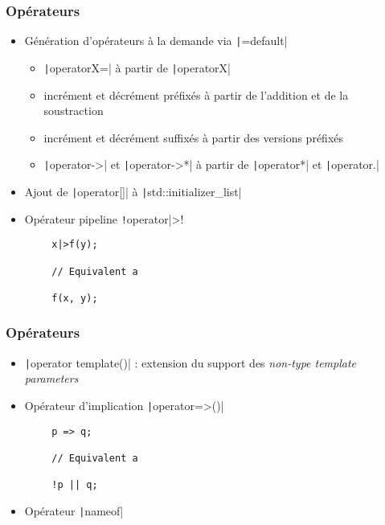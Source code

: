 \documentclass[C++.tex]{subfiles}
\begin{document}
\begin{frame}[fragile]
	\frametitle{Opérateurs}
	\begin{itemize}
		\item Génération d'opérateurs à la demande via \texttt|=default|
		\begin{itemize}
			\item \texttt|operatorX=| à partir de \texttt|operatorX|
			\item incrément et décrément préfixés à partir de l'addition et de la soustraction
			\item incrément et décrément suffixés à partir des versions préfixés
			\item \texttt|operator->| et \texttt|operator->*| à partir de \texttt|operator*| et \texttt|operator.|


		\end{itemize}
		\item Ajout de \texttt|operator[]| à \texttt|std::initializer_list|
		\item Opérateur pipeline \texttt!operator|>!
	\end{itemize}

	\begin{verbatim}
		x|>f(y);

		// Equivalent a

		f(x, y);
	\end{verbatim}

\end{frame}

\begin{frame}[fragile]
	\frametitle{Opérateurs}
	\begin{itemize}
		\item \texttt|operator template()| : extension du support des \textit{non-type template parameters}
		\item Opérateur d'implication \texttt|operator=>()|
	\end{itemize}

	\begin{verbatim}
		p => q;

		// Equivalent a

		!p || q;
	\end{verbatim}

	\begin{itemize}
		\item Opérateur \texttt|nameof|
	\end{itemize}

\end{frame}
\end{document}
